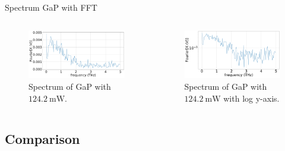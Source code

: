 \documentclass[aspectratio=1610, 9pt]{beamer}
\begin{document}
\begin{frame}{Spectrum GaP with FFT}
  \begin{columns}
    \begin{column}{.5\textwidth}
  \begin{figure}
    \includegraphics[width=\textwidth]{images/GaP14_55_42normalFX.pdf}
    \caption{\textcolor{tugreen}{Spectrum} of GaP with $\SI{124.2}{\milli\W}$.}
  \end{figure}
  \end{column}
  \begin{column}{.5\textwidth}
    \begin{figure}
      \includegraphics[width=\textwidth]{images/GaP14_55_42normallog(FX).pdf}
      \caption{\textcolor{tugreen}{Spectrum} of GaP with $\SI{124.2}{\milli\W}$ with log y-axis.}
    \end{figure}    
  \end{column}
  \end{columns}
\end{frame}

\subsection{Comparison}
\end{document}
